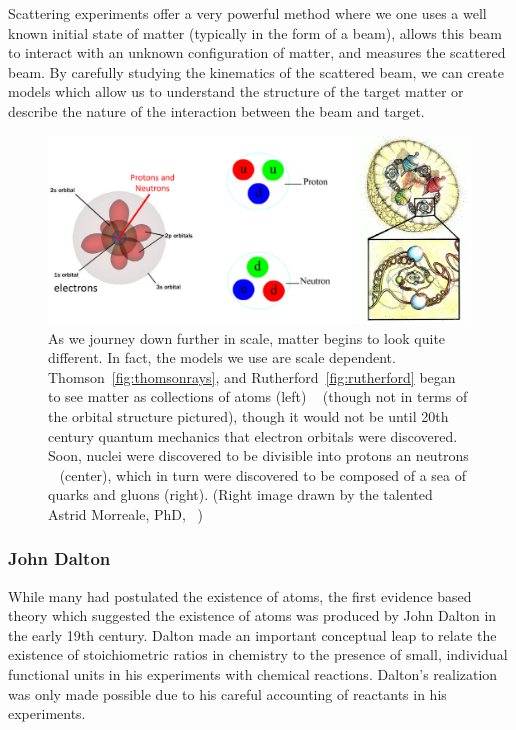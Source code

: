 Scattering experiments offer a very powerful method where we one uses a well
known initial state of matter (typically in the form of a beam), allows this
beam to interact with an unknown configuration of matter, and measures the
scattered beam. By carefully studying the kinematics of the scattered beam, we
can create models which allow us to understand the structure of the target
matter or describe the nature of the interaction between the beam and target. 

\begin{figure}[ht]
	\centering
	\includegraphics[width=\linewidth]{figures/scale_of_matter.png}
	\caption{
		As we journey down further in scale, matter begins to look quite different.
		In fact, the models we use are scale dependent.
		Thomson~\ref{fig:thomsonrays}, and Rutherford~\ref{fig:rutherford} began to
		see matter as collections of atoms (left) ~\cite{Freudenrich2001} (though
		not in terms of the orbital structure pictured), though it would not be
		until 20th century quantum mechanics that electron orbitals were
		discovered.  Soon, nuclei were discovered to be divisible into protons an
		neutrons ~\cite{Manisearth2010} (center), which in turn were discovered to
		be composed of a sea of quarks and gluons (right). (Right image drawn by
		the talented Astrid Morreale, PhD, ~\cite{Morreale2009})
	}
	\label{fig:scale_of_matter}
\end{figure}

\subsubsection{John Dalton}

While many had postulated the existence of atoms, the first evidence based
theory which suggested the existence of atoms was produced by John Dalton in the
early 19th century. Dalton made an important conceptual leap to relate the
existence of stoichiometric ratios in chemistry to the presence of small,
individual functional units in his experiments with chemical reactions.
Dalton's realization was only made possible due to his careful accounting of
reactants in his experiments.

